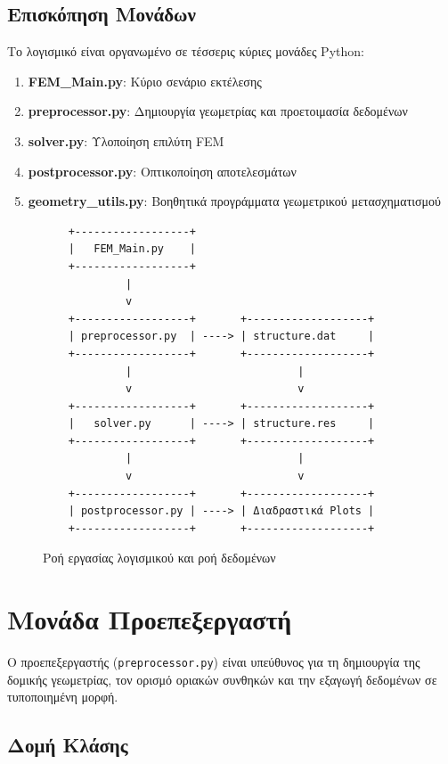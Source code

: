 \documentclass[12pt,a4paper]{article}
\begin{document}
\subsection{Επισκόπηση Μονάδων}

Το λογισμικό είναι οργανωμένο σε τέσσερις κύριες μονάδες Python:

\begin{enumerate}
    \item \textbf{FEM\_Main.py}: Κύριο σενάριο εκτέλεσης
    \item \textbf{preprocessor.py}: Δημιουργία γεωμετρίας και προετοιμασία δεδομένων
    \item \textbf{solver.py}: Υλοποίηση επιλύτη FEM
    \item \textbf{postprocessor.py}: Οπτικοποίηση αποτελεσμάτων
    \item \textbf{geometry\_utils.py}: Βοηθητικά προγράμματα γεωμετρικού μετασχηματισμού
\end{enumerate}

\begin{figure}[H]
\centering
\begin{verbatim}
    +------------------+
    |   FEM_Main.py    |
    +------------------+
             |
             v
    +------------------+       +-------------------+
    | preprocessor.py  | ----> | structure.dat     |
    +------------------+       +-------------------+
             |                          |
             v                          v
    +------------------+       +-------------------+
    |   solver.py      | ----> | structure.res     |
    +------------------+       +-------------------+
             |                          |
             v                          v
    +------------------+       +-------------------+
    | postprocessor.py | ----> | Διαδραστικά Plots |
    +------------------+       +-------------------+
\end{verbatim}
\caption{Ροή εργασίας λογισμικού και ροή δεδομένων}
\end{figure}

\section{Μονάδα Προεπεξεργαστή}

Ο προεπεξεργαστής (\texttt{preprocessor.py}) είναι υπεύθυνος για τη δημιουργία της δομικής γεωμετρίας, τον ορισμό οριακών συνθηκών και την εξαγωγή δεδομένων σε τυποποιημένη μορφή.

\subsection{Δομή Κλάσης}
\end{document}
